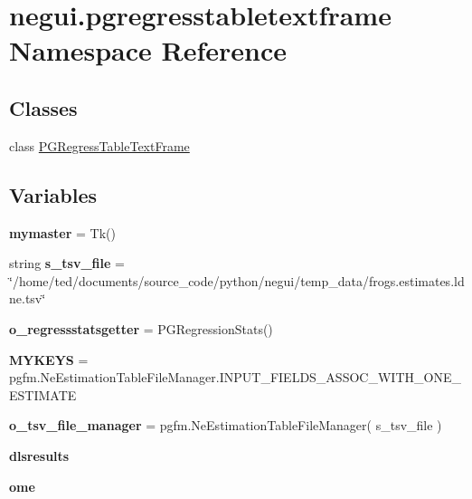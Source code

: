 \hypertarget{namespacenegui_1_1pgregresstabletextframe}{}\section{negui.\+pgregresstabletextframe Namespace Reference}
\label{namespacenegui_1_1pgregresstabletextframe}
\subsection*{Classes}
\begin{DoxyCompactItemize}
\item 
class \hyperlink{classnegui_1_1pgregresstabletextframe_1_1PGRegressTableTextFrame}{P\+G\+Regress\+Table\+Text\+Frame}
\end{DoxyCompactItemize}
\subsection*{Variables}
\begin{DoxyCompactItemize}
\item 
{\bfseries mymaster} = Tk()\hypertarget{namespacenegui_1_1pgregresstabletextframe_a1f1403ed43d2ebd9c2228d544e7b45e3}{}\label{namespacenegui_1_1pgregresstabletextframe_a1f1403ed43d2ebd9c2228d544e7b45e3}

\item 
string {\bfseries s\+\_\+tsv\+\_\+file} = \char`\"{}/home/ted/documents/source\+\_\+code/python/negui/temp\+\_\+data/frogs.\+estimates.\+ldne.\+tsv\char`\"{}\hypertarget{namespacenegui_1_1pgregresstabletextframe_a9462301fe9d903a7843a72abac3cb75e}{}\label{namespacenegui_1_1pgregresstabletextframe_a9462301fe9d903a7843a72abac3cb75e}

\item 
{\bfseries o\+\_\+regressstatsgetter} = P\+G\+Regression\+Stats()\hypertarget{namespacenegui_1_1pgregresstabletextframe_a2986690964b3f332dd53bd3dd392f328}{}\label{namespacenegui_1_1pgregresstabletextframe_a2986690964b3f332dd53bd3dd392f328}

\item 
{\bfseries M\+Y\+K\+E\+YS} = pgfm.\+Ne\+Estimation\+Table\+File\+Manager.\+I\+N\+P\+U\+T\+\_\+\+F\+I\+E\+L\+D\+S\+\_\+\+A\+S\+S\+O\+C\+\_\+\+W\+I\+T\+H\+\_\+\+O\+N\+E\+\_\+\+E\+S\+T\+I\+M\+A\+TE\hypertarget{namespacenegui_1_1pgregresstabletextframe_ababa06da28a273d39a0caf9d47c67873}{}\label{namespacenegui_1_1pgregresstabletextframe_ababa06da28a273d39a0caf9d47c67873}

\item 
{\bfseries o\+\_\+tsv\+\_\+file\+\_\+manager} = pgfm.\+Ne\+Estimation\+Table\+File\+Manager( s\+\_\+tsv\+\_\+file )\hypertarget{namespacenegui_1_1pgregresstabletextframe_ace92bbbfd43b8d4b942f4787f83bc79c}{}\label{namespacenegui_1_1pgregresstabletextframe_ace92bbbfd43b8d4b942f4787f83bc79c}

\item 
{\bfseries dlsresults}
\item 
{\bfseries ome}
\end{DoxyCompactItemize}


